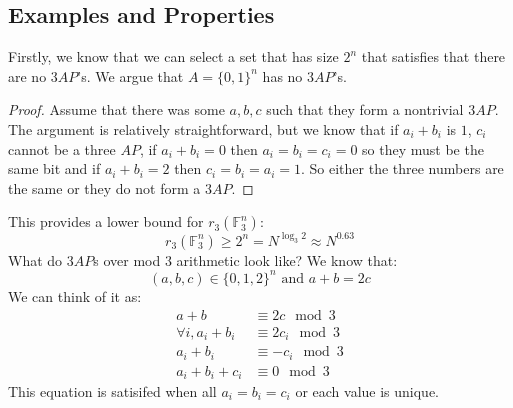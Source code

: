 \documentclass[11pt]{article}
\theoremstyle{definition}
\begin{document}
\subsection{Examples and Properties}
Firstly, we know that we can select a set that has size $2^n$ that satisfies that there are no $3AP$'s. We argue that $A = \{0,1\}^n$ has no $3AP$'s.
\begin{proof}
Assume that there was some $a,b,c$ such that they form a nontrivial $3AP$. The argument is relatively straightforward, but we know that if $a_i + b_i$ is $1$, $c_i$ cannot be a three $AP$, if $a_i + b_i = 0$ then $a_i=b_i=c_i=0$ so they must be the same bit and if $a_i + b_i = 2$ then $c_i = b_i = a_i = 1$. So either the three numbers are the same or they do not form a $3AP$.
\end{proof}
This provides a lower bound for $r_3(\mathbb{F}_3^n)$:
$$r_3(\mathbb{F}_3^n) \geq 2^n = N^{\log_3 2} \approx N^{0.63}$$
What do $3AP$s over mod $3$ arithmetic look like? We know that:
$$(a,b,c) \in \{0,1,2\}^n \text{ and } a+b=2c$$
We can think of it as:
\begin{align*}
    a + b &\equiv 2c \mod 3\\
    \forall i, a_i + b_i &\equiv 2c_i \mod 3\\
    a_i + b_i &\equiv -c_i \mod 3\\
    a_i + b_i + c_i &\equiv 0 \mod 3
\end{align*}
This equation is satisifed when all $a_i = b_i = c_i$ or each value is unique.
\end{document}
